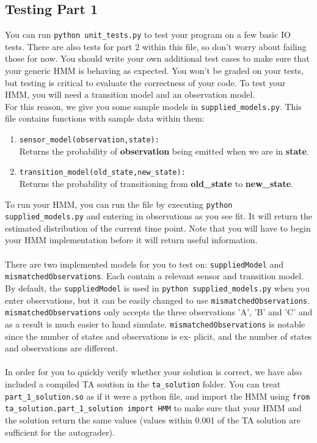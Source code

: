 \documentclass{article}
\begin{document}
    \subsection{Testing Part 1}
    \label{subsec:testingpart1}
    You can run \texttt{python unit\_tests.py} to test your program on a few basic IO tests. There are also tests for part 2 within this file, so don't worry about failing those for now. You should write your own additional test cases to make sure that your generic HMM is behaving as expected. You won't be graded on your tests, but testing is critical to evaluate the correctness of your code. To test your HMM, you will need a transition model and an observation model.\\
    For this reason, we give you some sample models in \texttt{supplied\_models.py}.  This file contains functions with sample data within them:
    \begin{enumerate}
        \item \texttt{sensor\_model(observation,state):} \\
        Returns the probability of \textbf{observation} being emitted when we are in \textbf{state}.
        \item \texttt{transition\_model(old\_state,new\_state):} \\
        Returns the probability of transitioning from \textbf{old\_state} to \textbf{new\_state}.\\
    \end{enumerate}
    To run your HMM, you can run the file by executing \texttt{python supplied\_models.py} and entering in observations as you see fit. It will return the estimated distribution of the current time point. Note that you will have to begin your HMM implementation before it will return useful information.
    \\\\
    There are two implemented models for you to test on: \texttt{suppliedModel} and \texttt{mismatchedObservations}.
    Each contain a relevant sensor and transition model. By default, the \texttt{suppliedModel} is used in \texttt{python
    supplied\_models.py} when you enter observations, but it can be easily changed to use \texttt{mismatchedObservations}.
    \texttt{mismatchedObservations} only accepts the three observations ’A’, ’B’ and ’C’ and as a result is much easier to hand simulate. \texttt{mismatchedObservations} is notable since the number of states and observations is ex-
    plicit, and the number of states and observations are different.
    \\
    \\
    In order for you to quickly verify whether your solution is correct, we have also included a compiled TA soution in the \texttt{ta\_solution} folder. You can treat \texttt{part\_1\_solution.so} as if it were a python file, and import the HMM using \texttt{from ta\_solution.part\_1\_solution import HMM} to make sure that your HMM and the solution return the same values (values within 0.001 of the TA solution are sufficient for the autograder).
\end{document}
